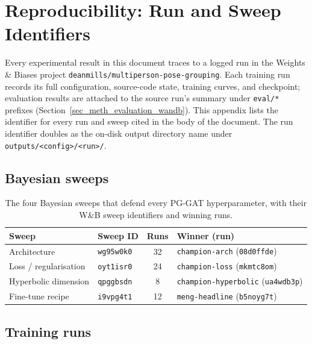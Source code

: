 
\chapter{Reproducibility: Run and Sweep Identifiers}
\label{appendix_repro}

Every experimental result in this document traces to a logged run in the Weights \& Biases project
\texttt{deanmills/multiperson-pose-grouping}.
Each training run records its full configuration, source-code state, training curves, and checkpoint;
evaluation results are attached to the source run's summary under \texttt{eval/*} prefixes
(Section~\ref{sec_meth_evaluation_wandb}).
This appendix lists the identifier for every run and sweep cited in the body of the document.
The run identifier doubles as the on-disk output directory name under \texttt{outputs/<config>/<run>/}.

\section{Bayesian sweeps}
\label{appendix_repro_sweeps}

\begin{table}[H]
\centering
\caption[The four Bayesian sweeps that defend every PG-GAT hyperparameter, with their W\&B sweep identifiers and winning runs.]{The four Bayesian sweeps that defend every PG-GAT hyperparameter,
with their W\&B sweep identifiers and winning runs.}
\label{tab:appendix_sweeps}
\tablesize
\begin{tabular}{llcl}
\toprule
Sweep & Sweep ID & Runs & Winner (run) \\
\midrule
Architecture           & \texttt{wg95w0k0} & 32 & \texttt{champion-arch} (\texttt{08d0ffde}) \\
Loss / regularisation  & \texttt{oyt1isr0} & 24 & \texttt{champion-loss} (\texttt{mkmtc8om}) \\
Hyperbolic dimension   & \texttt{qpggbsdn} & 8  & \texttt{champion-hyperbolic} (\texttt{ua4wdb3p}) \\
Fine-tune recipe       & \texttt{i9vpg4t1} & 12 & \texttt{meng-headline} (\texttt{b5noyg7t}) \\
\bottomrule
\end{tabular}
\end{table}

\section{Training runs}
\label{appendix_repro_runs}

